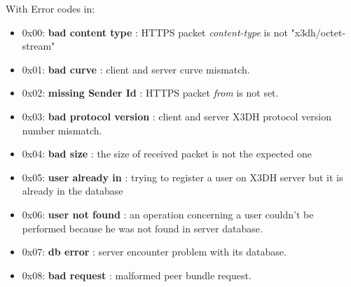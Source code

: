 \documentclass[a4paper,11pt]{article}
\begin{document}
    With Error codes in:
    \begin{itemize}
      \item 0x00: \textbf{bad content type} : HTTPS packet \textit{content-type} is not "x3dh/octet-stream"
      \item 0x01: \textbf{bad curve} : client and server curve mismatch.
      \item 0x02: \textbf{missing Sender Id} : HTTPS packet \textit{from} is not set.
      \item 0x03: \textbf{bad protocol version} : client and server X3DH protocol version number mismatch.
      \item 0x04: \textbf{bad size} : the size of received packet is not the expected one
      \item 0x05: \textbf{user already in} : trying to register a user on X3DH server but it is already in the database
      \item 0x06: \textbf{user not found} : an operation concerning a user couldn't be performed because he was not found in server database.
      \item 0x07: \textbf{db error} : server encounter problem with its database.
      \item 0x08: \textbf{bad request} : malformed peer bundle request.
    \end{itemize}
\newpage
\end{document}

